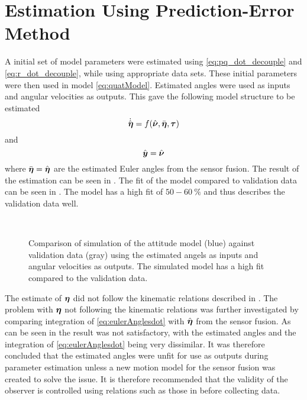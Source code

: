 \section{Estimation Using Prediction-Error Method}\label{sec:estimPEM}  
A initial set of model parameters were estimated using \eqref{eq:pq_dot_decouple} and \eqref{eq:r_dot_decouple}, while using appropriate data sets. These initial parameters were then used in model \eqref{eq:quatModel}. Estimated angles were used as inputs and angular velocities as outputs. This gave the following model structure to be estimated
\begin{equation}
\dot{\hat{\boldsymbol{\eta}}} = f(\hat{\boldsymbol{\nu}}, \bar{\boldsymbol{\eta}}, \boldsymbol{\tau})
\end{equation}
and
\begin{equation}
\hat{\boldsymbol{y}} = \hat{\boldsymbol{\nu}}
\end{equation}
where $\bar{\boldsymbol{\eta}} = \hat{\boldsymbol{\eta}}$ are the estimated Euler angles from the sensor fusion.
The result of the estimation can be seen in .  The fit of the model compared to validation data can be seen in . The model has a high fit of $50-60\ \%$ and thus describes the validation data well.
\begin{figure}[tbp]
  \centering
  \qquad
  \\
  \caption{\label{fig:velocityCompareCong}%
    Comparison of simulation of the attitude model (blue) against validation data (gray) using the estimated angels as inputs and angular velocities as outputs. The simulated model has a high fit compared to the validation data.}
\end{figure}

The estimate of $\boldsymbol{\eta}$ did not follow the kinematic relations described in . The problem with $\boldsymbol{\eta}$ not following the kinematic relations was further investigated by comparing integration of \eqref{eq:eulerAnglesdot} with $\hat{\boldsymbol{\eta}}$ from the sensor fusion. As can be seen in  the result was not satisfactory, with the estimated angles and the integration of \eqref{eq:eulerAnglesdot} being very dissimilar. It was therefore concluded that the estimated angles were unfit for use as outputs during parameter estimation unless a new motion model for the sensor fusion was created to solve the issue. It is therefore recommended that the validity of the observer is controlled using relations such as those in  before collecting data. 

